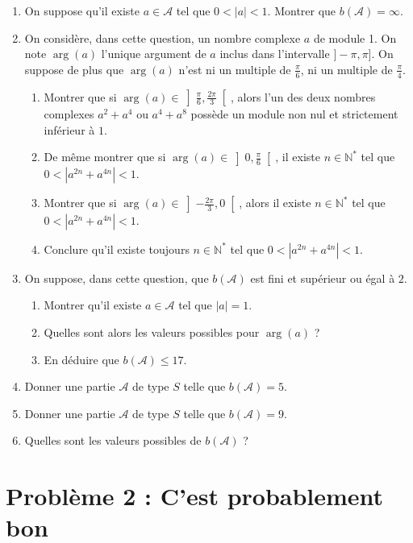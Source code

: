 \documentclass[landscape,twocolumn,leqno,a4paper,10pt]{report} %
\renewcommand{\leq}{\leqslant}
\begin{document}
\begin{enumerate}
	\item On suppose qu'il existe $a \in \mathscr{A}$ tel que $0<|a|<1$. Montrer que $b(\mathscr{A})=\infty$.
	\item On considère, dans cette question, un nombre complexe $a$ de module 1. On note $\arg(a)$ l'unique argument de $a$ inclus dans l'intervalle $]-\pi, \pi]$. On suppose de plus que $\arg(a)$ n'est ni un multiple de $\frac{\pi}{6}$, ni un multiple de $\frac{\pi}{4}$.
	\begin{enumerate}
		\item Montrer que si $\arg(a) \in\left ] \frac{\pi}{6}, \frac{2 \pi}{3}\right[$, alors l'un des deux nombres complexes $a^{2}+a^{4}$ ou $a^{4}+a^{8}$ possède un module non nul et strictement inférieur à $1$.
		\item De même montrer que si $\arg(a) \in\left ] 0, \frac{\pi}{6}\right[$, il existe $n \in \mathbb{N}^{*}$ tel que $0<\left|a^{2 n}+a^{4 n}\right|<1$.
		\item Montrer que si $\arg(a) \in \left ]-\frac{2 \pi}{3}, 0\right[$, alors il existe $n \in \mathbb{N}^{*}$ tel que $0<\left|a^{2 n}+a^{4 n}\right|<1$.
		\item Conclure qu'il existe toujours $n \in \mathbb{N}^{*}$ tel que $0<\left|a^{2 n}+a^{4 n}\right|<1$.
	\end{enumerate}
	\item On suppose, dans cette question, que $b(\mathscr{A})$ est fini et supérieur ou égal à $2$.
	\begin{enumerate}
		\item Montrer qu'il existe $a \in \mathscr{A}$ tel que $|a|=1$.
		\item Quelles sont alors les valeurs possibles pour $\arg(a)$ ?
		\item En déduire que $b(\mathscr{A}) \leq 17$.
	\end{enumerate}
	\item Donner une partie $\mathscr{A}$ de type $S$ telle que $b(\mathscr{A})=5$.
	\item Donner une partie $\mathscr{A}$ de type $S$ telle que $b(\mathscr{A})=9$.
	\item Quelles sont les valeurs possibles de $b(\mathscr{A})$ ?
\end{enumerate}


\section{Problème 2 : C'est probablement bon}
\end{document}
